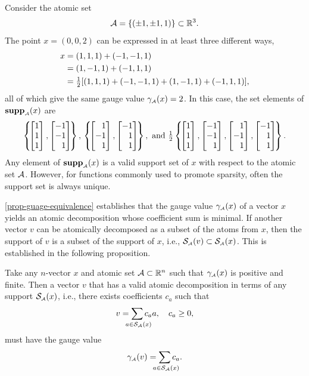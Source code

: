   \begin{example}
    Consider the atomic set
    \[
      \mathcal{A}=\{(\pm1,\pm1,1)\}\subset\mathbb{R}^3.
    \]
    The point $x=(0,0,2)$ can be expressed in at least three different ways,
    \begin{align*}
      x &= (1,1,1) + (-1,-1,1)
      \\&= (1,-1,1) + (-1,1,1)
      \\&= {\textstyle{\frac{1}{2}}}[(1,1,1) + (-1,-1,1) + (1,-1,1) + (-1,1,1)],
    \end{align*}
    all of which give the same gauge value $\gamma_{\scriptscriptstyle\mathcal{A}} (x)=2$. In this case, the set
    elements of $\operatorname{\hbox{\rm\textbf{supp}}}_{\scriptscriptstyle\mathcal{A}}(x)$ are 
    \begin{align*}
        \left\{\! 
          \bmatr{ 1 \\ 1 \\ 1}, 
          \bmatr{-1 \\ -1 \\ 1}
        \!\right\},
        \,
      \left\{\! 
        \bmatr{1 \\ -1 \\ 1},
        \bmatr{-1 \\ 1 \\ 1}
      \!\right \},
      \mbox{ and } 
      \half\left\{\! 
        \bmatr{ 1 \\  1 \\ 1},
        \bmatr{-1 \\ -1 \\ 1},
        \bmatr{ 1 \\ -1 \\ 1},
        \bmatr{-1 \\  1 \\ 1}
      \!\right \}.
  \end{align*}
  Any element of $\operatorname{\hbox{\rm\textbf{supp}}}_{\scriptscriptstyle\mathcal{A}}(x)$ is a valid support set of $x$ with
  respect to the atomic set $\mathcal{A}$.  However, for functions commonly
  used to promote sparsity, often the support set is always unique.
  \end{example}

  \autoref{prop-guage-equivalence} establishes that the gauge value
$\gamma_{\scriptscriptstyle\mathcal{A}}(x)$ of a vector $x$ yields an atomic decomposition whose
coefficient sum is minimal. If another vector $v$ can be atomically
decomposed as a subset of the atoms from $x$, then the support of $v$
is a subset of the support of $x$, i.e.,
$\operatorname{\mathcal{S}_{\scriptscriptstyle\mathcal{A}}}(v)\subset\operatorname{\mathcal{S}_{\scriptscriptstyle\mathcal{A}}}(x)$. This is established in the following
proposition.

\begin{proposition} \label{prop:same-support-sets} 
  Take any
  $n$-vector $x$ and atomic set $\mathcal{A}\subset\mathbb{R}^n$ such that
  $\gamma_{\scriptscriptstyle\mathcal{A}}(x)$ is positive and finite. Then
  a vector $v$ that has a valid atomic decomposition in terms of any support
  $\mathcal{S}_{\scriptscriptstyle\mathcal{A}}(x)$, i.e., there exists coefficients $c_a$ such that
  \begin{equation}\label{eq:28} 
    v = \sum_{\ \mathclap{a\in \suppa(x)}}c_a a, \quad c_a \geq 0,
  \end{equation}
  must have the gauge value 
  \[\gauge\As(v) = \sum_{\ \mathclap{a\in \suppa(x)}}c_a.\]
\end{proposition}

